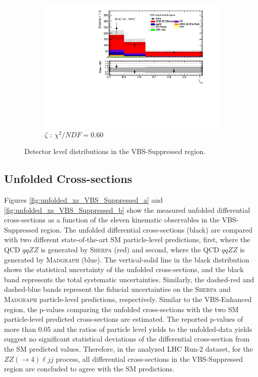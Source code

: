 \begin{figure}[!htb]
\begin{subfigure}{.49\textwidth}
        \includegraphics[width=.98\linewidth]{figures/Results/RecoDist_VBSSuppressed/reco_centrality_CR.pdf}
        \caption{ \footnotesize{$\zeta$ }: $\chi^2/NDF = 0.60$ }
    \end{subfigure}
    \caption{Detector level distributions in the VBS-Suppressed region.}  \label{fig:reco_VBS_Suppressed_b}
\end{figure}

\subsection{Unfolded Cross-sections}
\label{appendix:VBSSupUnfolded}

Figures \ref{fig:unfolded_xs_VBS_Suppressed_a} and \ref{fig:unfolded_xs_VBS_Suppressed_b} show the measured unfolded differential cross-sections as a function of the eleven kinematic observables in the VBS-Suppressed region. The unfolded differential cross-sections (black) are compared with two different state-of-the-art SM particle-level predictions, first, where the QCD $qqZZ$ is generated by \textsc{Sherpa} (red) and second, where the QCD $qqZZ$ is generated by \textsc{Madgraph} (blue). The vertical-solid line in the black distribution shows the statistical uncertainty of the unfolded cross-sections, and the black band represents the total systematic uncertainties. Similarly, the dashed-red and dashed-blue bands represent the fiducial uncertainties on the \textsc{Sherpa} and \textsc{Madgraph} particle-level predictions, respectively. Similar to the VBS-Enhanced region, the p-values comparing the unfolded cross-sections with the two SM particle-level predicted cross-sections are estimated. The reported p-values of more than $0.05$ and the ratios of particle level yields to the unfolded-data yields suggest no significant statistical deviations of the differential cross-section from the SM predicted values. Therefore, in the analyzed LHC Run-2 dataset, for the $ZZ (\rightarrow 4) \ell jj$ process, all differential cross-sections in the VBS-Suppressed region are concluded to agree with the SM predictions. 

